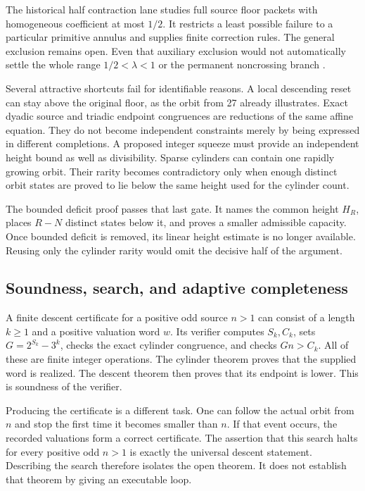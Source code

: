 The historical half contraction lane studies full source floor packets with homogeneous coefficient at most $1/2$. It restricts a least possible failure to a particular primitive annulus and supplies finite correction rules. The general exclusion remains open. Even that auxiliary exclusion would not automatically settle the whole range $1/2<\lambda<1$ or the permanent noncrossing branch \cite{projectcollatzaudit,projectcollatzgap}.

Several attractive shortcuts fail for identifiable reasons. A local descending reset can stay above the original floor, as the orbit from 27 already illustrates. Exact dyadic source and triadic endpoint congruences are reductions of the same affine equation. They do not become independent constraints merely by being expressed in different completions. A proposed integer squeeze must provide an independent height bound as well as divisibility. Sparse cylinders can contain one rapidly growing orbit. Their rarity becomes contradictory only when enough distinct orbit states are proved to lie below the same height used for the cylinder count.

The bounded deficit proof passes that last gate. It names the common height $H_R$, places $R-N$ distinct states below it, and proves a smaller admissible capacity. Once bounded deficit is removed, its linear height estimate is no longer available. Reusing only the cylinder rarity would omit the decisive half of the argument.

\subsection{Soundness, search, and adaptive completeness}
A finite descent certificate for a positive odd source $n>1$ can consist of a length $k\ge1$ and a positive valuation word $w$. Its verifier computes $S_k,C_k$, sets $G=2^{S_k}-3^k$, checks the exact cylinder congruence, and checks $Gn>C_k$. All of these are finite integer operations. The cylinder theorem proves that the supplied word is realized. The descent theorem then proves that its endpoint is lower. This is soundness of the verifier.

Producing the certificate is a different task. One can follow the actual orbit from $n$ and stop the first time it becomes smaller than $n$. If that event occurs, the recorded valuations form a correct certificate. The assertion that this search halts for every positive odd $n>1$ is exactly the universal descent statement. Describing the search therefore isolates the open theorem. It does not establish that theorem by giving an executable loop.

